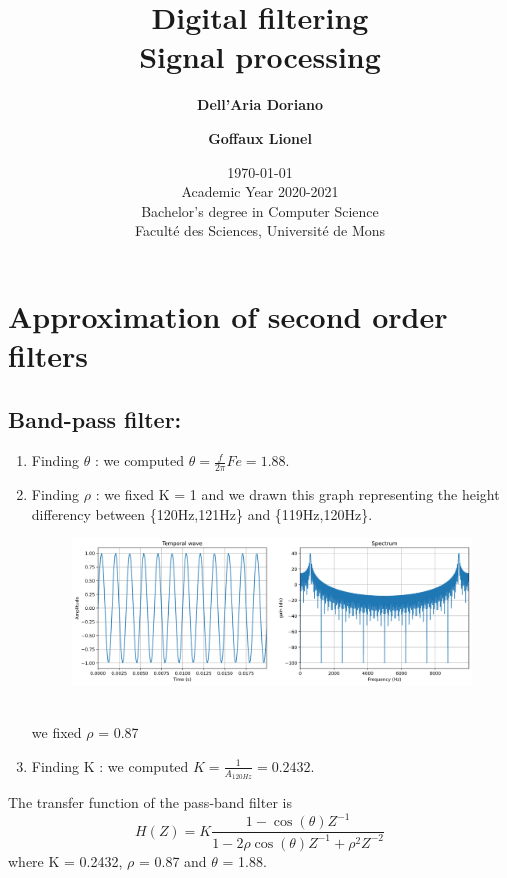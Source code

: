\documentclass[]{article}
\title{
{\Huge Digital filtering}\\
Signal processing\\
}
\author{
\textbf{Dell’Aria Doriano}\\
\and
\textbf{Goffaux Lionel}
}
\date{\today\\
Academic Year 2020-2021\\
Bachelor's degree in Computer Science\\
\vspace{1cm}
Faculté des Sciences, Université de Mons}
\begin{document}
\maketitle
\pagebreak

\section{Approximation of second order filters}
\subsection*{Band-pass filter:}
\begin{enumerate}
    \item Finding $\theta$ : we computed $\theta = \frac{f}{2\pi}Fe = 1.88$.
    \item Finding $\rho$ : we fixed K = 1 and we drawn this graph representing the height differency between \{120Hz,121Hz\} and \{119Hz,120Hz\}.
    \begin{figure}[h]
        \centering
        \includegraphics[scale=0.25]{q1.png}
    \end{figure}\\
    we fixed $\rho$ = 0.87
    \item Finding K : we computed $K = \frac{1}{A_{120Hz}}=0.2432$.
\end{enumerate}
The transfer function of the pass-band filter is 
$$H(Z) = K\frac{1 - \cos{(\theta)} Z^{-1}}{1 - 2\rho \cos{(\theta)Z^{-1} +\rho^2Z^{-2}}}$$
where K = 0.2432, $\rho$ = 0.87 and $\theta$ = 1.88.
\end{document}
